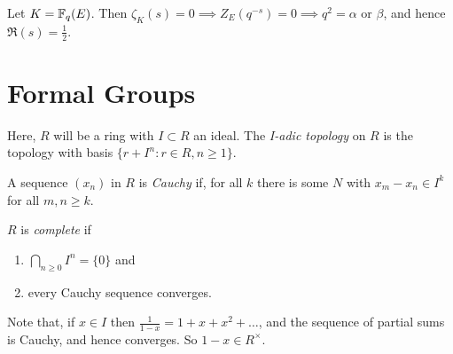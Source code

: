 \documentclass[10pt,a4paper]{article}
\begin{document}
Let $K = \mathbb{F}_q(E)$. Then $\zeta_K(s) = 0 \implies Z_E(q^{-s}) = 0 \implies q^2 = \alpha$ or $\beta$, and hence $\Re(s) = \frac{1}{2}$.

\section{Formal Groups}
Here, $R$ will be a ring with $I \subset R$ an ideal. The \emph{I-adic topology} on $R$ is the topology with basis $\{r+I^n: r\in R, n\geq 1\}$.

A sequence $(x_n)$ in $R$ is \emph{Cauchy} if, for all $k$ there is some $N$ with $x_m-x_n \in I^k$ for all $m, n \geq k$.

$R$ is \emph{complete} if
\begin{enumerate}
  \item $\bigcap_{n\geq 0} I^n = \{0\}$ and
  \item every Cauchy sequence converges.
\end{enumerate}
Note that, if $x \in I$ then $\frac{1}{1-x} = 1+x+x^2+\ldots$, and the sequence of partial sums is Cauchy, and hence converges. So $1-x \in R^\times$.
\end{document}
